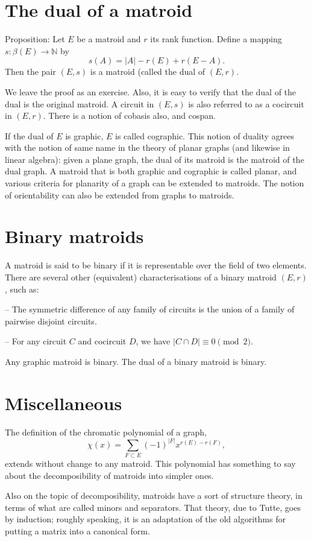 \documentclass[12pt]{article}
\newcommand{\N}{\mathbb{N}}
\begin{document}
\section{The dual of a matroid}
Proposition: Let $E$ be a matroid and $r$ its rank function.
Define a mapping $s:\beta(E)\to\N$ by
$$s(A)=|A|-r(E)+r(E-A).$$
Then the pair $(E,s)$ is a matroid (called the dual of $(E,r)$.

We leave the proof as an exercise.
Also, it is easy to verify that the
dual of the dual is the original matroid.
A circuit in $(E,s)$ is also
referred to as a cocircuit in $(E,r)$.
There is a notion of cobasis also, and cospan.

If the dual of $E$ is graphic, $E$ is called cographic.
This notion of
duality agrees with the notion of same name in the theory of planar
graphs (and likewise in linear algebra): given a plane graph, the dual
of its matroid is the matroid of the dual graph.
A matroid that is both
graphic and cographic is called planar, and various criteria for
planarity of a graph can be extended to matroids.
The notion of
orientability can also be extended from graphs to matroids.

\section{Binary matroids}
A matroid is said to be binary if it is representable over the field of
two elements.
There are several other (equivalent) characterisations of a binary
matroid $(E,r)$, such as:

-- The symmetric difference of any family of circuits is the union of
a family of pairwise disjoint circuits.

-- For any circuit $C$ and cocircuit $D$, we have $|C\cap D|\equiv 0 \pmod 2$.

Any graphic matroid is binary.
The dual of a binary matroid is binary.

\section{Miscellaneous}
The definition of the chromatic polynomial of a graph,
$$\chi(x)=\sum_{F\subset E}(-1)^{|F|}x^{r(E)-r(F)},$$
extends without change to any matroid.
This polynomial has something to say about the decomposibility of
matroids into simpler ones.

Also on the topic of decomposibility, matroids have a sort of
structure theory, in terms of what are called minors and separators.
That theory, due to Tutte, goes by induction; roughly speaking,
it is an adaptation of the old algorithms for putting
a matrix into a canonical form.
\end{document}
